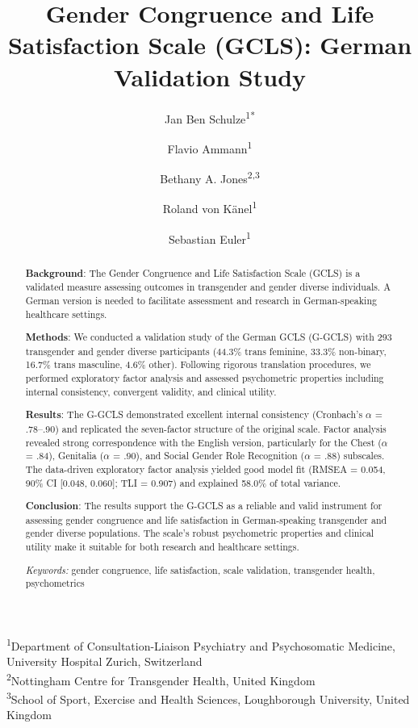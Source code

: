 \documentclass[12pt,a4paper]{article}
\title{Gender Congruence and Life Satisfaction Scale (GCLS): German Validation Study}
\author{
Jan Ben Schulze\textsuperscript{1*} \and
Flavio Ammann\textsuperscript{1} \and
Bethany A. Jones\textsuperscript{2,3} \and
Roland von Känel\textsuperscript{1} \and
Sebastian Euler\textsuperscript{1}
}
\begin{document}
\maketitle

\begin{abstract}
\noindent
\textbf{Background}: The Gender Congruence and Life Satisfaction Scale (GCLS) is a validated measure assessing outcomes in transgender and gender diverse individuals. A German version is needed to facilitate assessment and research in German-speaking healthcare settings.

\textbf{Methods}: We conducted a validation study of the German GCLS (G-GCLS) with 293 transgender and gender diverse participants (44.3\% trans feminine, 33.3\% non-binary, 16.7\% trans masculine, 4.6\% other). Following rigorous translation procedures, we performed exploratory factor analysis and assessed psychometric properties including internal consistency, convergent validity, and clinical utility.

\textbf{Results}: The G-GCLS demonstrated excellent internal consistency (Cronbach's $\alpha$ = .78--.90) and replicated the seven-factor structure of the original scale. Factor analysis revealed strong correspondence with the English version, particularly for the Chest ($\alpha$ = .84), Genitalia ($\alpha$ = .90), and Social Gender Role Recognition ($\alpha$ = .88) subscales. The data-driven exploratory factor analysis yielded good model fit (RMSEA = 0.054, 90\% CI [0.048, 0.060]; TLI = 0.907) and explained 58.0\% of total variance.

\textbf{Conclusion}: The results support the G-GCLS as a reliable and valid instrument for assessing gender congruence and life satisfaction in German-speaking transgender and gender diverse populations. The scale's robust psychometric properties and clinical utility make it suitable for both research and healthcare settings.

\noindent
\textit{Keywords:} gender congruence, life satisfaction, scale validation, transgender health, psychometrics
\end{abstract}

\vspace{1em}
\noindent
\textsuperscript{1}Department of Consultation-Liaison Psychiatry and Psychosomatic Medicine, University Hospital Zurich, Switzerland\\
\textsuperscript{2}Nottingham Centre for Transgender Health, United Kingdom\\
\textsuperscript{3}School of Sport, Exercise and Health Sciences, Loughborough University, United Kingdom\\
\end{document}
